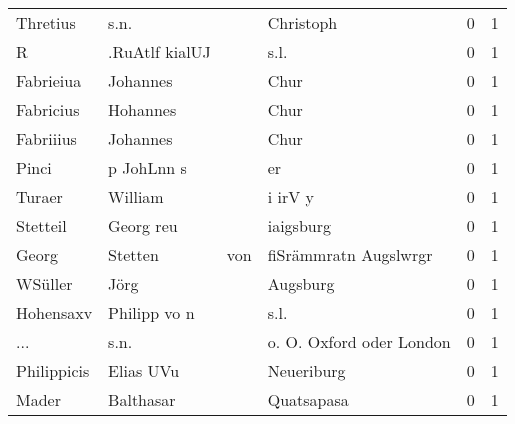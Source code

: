 \begin{tabular}{llllrr}
                 Thretius &                               s.n. &             &                                   Christoph &          0 &         1 \\
                        R &                     .RuAtlf kialUJ &             &                                        s.l. &          0 &         1 \\
                Fabrieiua &                           Johannes &             &                                        Chur &          0 &         1 \\
                Fabricius &                           Hohannes &             &                                        Chur &          0 &         1 \\
                Fabriiius &                           Johannes &             &                                        Chur &          0 &         1 \\
                    Pinci &                         p JohLnn s &             &                                          er &          0 &         1 \\
                   Turaer &                            William &             &                                     i irV y &          0 &         1 \\
                 Stetteil &                          Georg reu &             &                                   iaigsburg &          0 &         1 \\
                    Georg &                            Stetten &         von &                       fiSrämmratn Augslwrgr &          0 &         1 \\
                  WSüller &                               Jörg &             &                                    Augsburg &          0 &         1 \\
                Hohensaxv &                       Philipp vo n &             &                                        s.l. &          0 &         1 \\
                      ... &                               s.n. &             &                    o. O. Oxford oder London &          0 &         1 \\
              Philippicis &                          Elias UVu &             &                                  Neueriburg &          0 &         1 \\
                    Mader &                          Balthasar &             &                                  Quatsapasa &          0 &         1 \\

\end{tabular}
